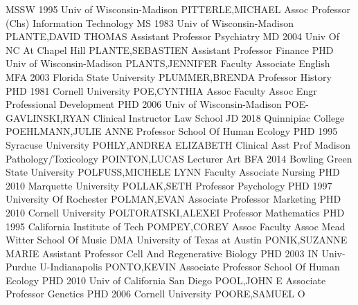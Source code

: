 \documentclass[
]{article}
\begin{document}
\textbar MSSW 1995 Univ of Wisconsin-Madison \textbar{} 
\textbar PITTERLE,MICHAEL \textbar Assoc Professor (Chs)
\textbar Information Technology \textbar MS 1983 Univ of
Wisconsin-Madison \textbar{}  \textbar PLANTE,DAVID THOMAS
\textbar Assistant Professor \textbar Psychiatry \textbar MD 2004 Univ
Of NC At Chapel Hill \textbar{}  \textbar PLANTE,SEBASTIEN
\textbar Assistant Professor \textbar Finance \textbar PHD Univ of
Wisconsin-Madison \textbar{}  \textbar PLANTS,JENNIFER
\textbar Faculty Associate \textbar English \textbar MFA 2003 Florida
State University \textbar{}  \textbar PLUMMER,BRENDA
\textbar Professor \textbar History \textbar PHD 1981 Cornell University
\textbar{}  \textbar POE,CYNTHIA \textbar Assoc Faculty
Assoc \textbar Engr Professional Development \textbar PHD 2006 Univ of
Wisconsin-Madison \textbar{}  \textbar POE-GAVLINSKI,RYAN
\textbar Clinical Instructor \textbar Law School \textbar JD 2018
Quinnipiac College \textbar{}  \textbar POEHLMANN,JULIE ANNE
\textbar Professor \textbar School Of Human Ecology \textbar PHD 1995
Syracuse University \textbar{}  \textbar POHLY,ANDREA
ELIZABETH \textbar Clinical Asst Prof \textbar Madison
Pathology/Toxicology \textbar POINTON,LUCAS \textbar{} 
\textbar Lecturer \textbar Art \textbar BFA 2014 Bowling Green State
University \textbar POLFUSS,MICHELE LYNN \textbar{} 
\textbar Faculty Associate \textbar Nursing \textbar PHD 2010 Marquette
University \textbar POLLAK,SETH \textbar{} 
\textbar Professor \textbar Psychology \textbar PHD 1997 University Of
Rochester \textbar POLMAN,EVAN \textbar{} 
\textbar Associate Professor \textbar Marketing \textbar PHD 2010
Cornell University \textbar POLTORATSKI,ALEXEI \textbar{} 
\textbar Professor \textbar Mathematics \textbar PHD 1995 California
Institute of Tech \textbar POMPEY,COREY \textbar{} 
\textbar Assoc Faculty Assoc \textbar Mead Witter School Of Music
\textbar DMA University of Texas at Austin \textbar PONIK,SUZANNE MARIE
\textbar{}  \textbar Assistant Professor \textbar Cell And
Regenerative Biology \textbar PHD 2003 IN Univ-Purdue U-Indianapolis
\textbar PONTO,KEVIN \textbar{}  \textbar Associate
Professor \textbar School Of Human Ecology \textbar PHD 2010 Univ of
California San Diego \textbar POOL,JOHN E \textbar{} 
\textbar Associate Professor \textbar Genetics \textbar PHD 2006 Cornell
University \textbar POORE,SAMUEL O \textbar{} 
\end{document}
